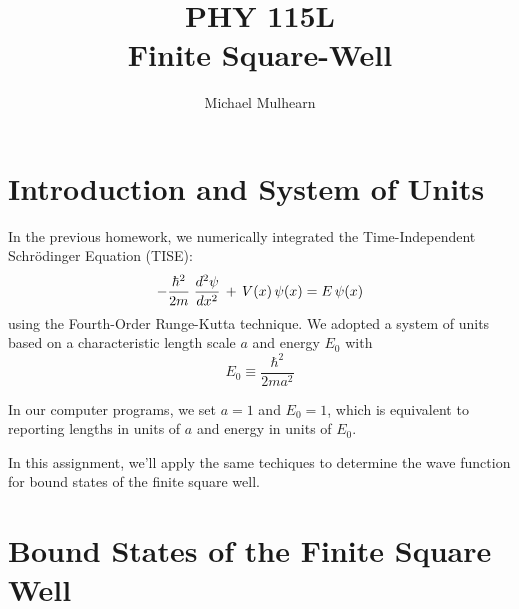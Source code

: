 \documentclass[12pt]{article}
\begin{document}
\newcommand{\ihbar}{\ensuremath{i \hbar}}
\newcommand{\Pss}{\ensuremath{\Psi^*}}
\newcommand{\dPsidt}{\ensuremath{ \frac{\partial \Psi}{\partial t} }}
\newcommand{\dPsidx}{\ensuremath{ \frac{\partial \Psi}{\partial x} }}
\newcommand{\ddPsidx}{\ensuremath{ \frac{\partial^2 \Psi}{\partial x^2} }}
\newcommand{\dPssdt}{\ensuremath{ \frac{\partial \Psi^*}{\partial t} }}
\newcommand{\dPssdx}{\ensuremath{ \frac{\partial \Psi^*}{\partial x} }}
\newcommand{\ddPssdx}{\ensuremath{ \frac{\partial^2 \Psi^*}{\partial x^2} }}

\newcommand{\dphidt}{\ensuremath{ \frac{d \phi}{dt} }}
\newcommand{\dpsidx}{\ensuremath{ \frac{d \psi}{dx} }}
\newcommand{\ddpsidx}{\ensuremath{ \frac{d^2 \psi}{dx^2} }}


\title{PHY 115L \\ Finite Square-Well}
\author{Michael Mulhearn}

\maketitle

\section{Introduction and System of Units}

In the previous homework, we numerically integrated the Time-Independent Schr\"odinger Equation (TISE):
\begin{equation}
- \frac{\hbar^2}{2 m} \; \ddpsidx \, + \, V(x) \, \psi(x) = E \, \psi(x)\\
\end{equation}
using the Fourth-Order Runge-Kutta technique.  We adopted a system of units based on a characteristic length scale $a$ and energy $E_0$ with
\begin{equation}
E_0 \equiv \frac{\hbar^2}{2ma^2}
\end{equation}

In our computer programs, we set $a=1$ and $E_0=1$, which is
equivalent to reporting lengths in units of $a$ and energy in units of
$E_0$.

In this assignment, we'll apply the same techiques to determine the
wave function for bound states of the finite square well.

\section{Bound States of the Finite Square Well}
\end{document}
